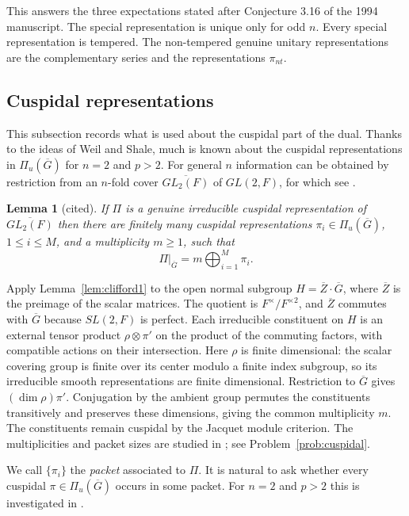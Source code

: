 \documentclass[12pt,letterpaper]{article}
\numberwithin{equation}{section}
\newtheorem{lemma}[theorem]{Lemma}
\theoremstyle{definition}
\newcommand{\cited}{cited}
\newcommand{\bG}{\overline{G}}
\newcommand{\Piu}{\Pi_{u}(\bG)}
\begin{document}
This answers the three expectations stated after Conjecture 3.16 of the 1994 manuscript.
The special representation is unique only for odd $n$.  Every special representation is
tempered.  The non-tempered genuine unitary representations are the complementary series
and the representations $\pi_{nt}$.

\subsection{Cuspidal representations}\label{subsec:cuspidal}

This subsection records what is used about the cuspidal part of the dual.  Thanks to the
ideas of Weil and Shale, much is known about the cuspidal representations in $\Piu$ for
$n=2$ and $p>2$.  For general $n$ information can be obtained by restriction from an
$n$-fold cover $\overline{GL_2(F)}$ of $GL(2,F)$, for which see \cite{Fl80,Bl85,GSS26}.

\begin{lemma}[\cited]\label{lem:restriction}
If $\Pi$ is a genuine irreducible cuspidal representation of $\overline{GL_2(F)}$ then
there are finitely many cuspidal representations $\pi_i\in\Piu$, $1\le i\le M$, and a
multiplicity $m\ge1$, such that
\[
\Pi|_{\bG}=m\bigoplus_{i=1}^M\pi_i .
\]
\end{lemma}
Apply Lemma~\ref{lem:clifford1} to the open normal subgroup
$H=\overline Z\cdot\bG$, where $\overline Z$ is the preimage of the scalar matrices.
The quotient is $F^\times/F^{\times2}$, and $\overline Z$ commutes with $\bG$
because $SL(2,F)$ is perfect. Each irreducible constituent on $H$ is an external
tensor product $\rho\otimes\pi'$ on the product of the commuting factors, with
compatible actions on their intersection. Here $\rho$ is finite dimensional:
the scalar covering group is finite over its center modulo a finite index
subgroup, so its irreducible smooth representations are finite dimensional.
Restriction to $\bG$ gives $(\dim\rho)\pi'$. Conjugation by the ambient group
permutes the constituents transitively and preserves these dimensions, giving
the common multiplicity $m$. The constituents remain cuspidal by the Jacquet
module criterion. The multiplicities and packet sizes are studied in
\cite{GSS26}; see Problem~\ref{prob:cuspidal}.

We call $\{\pi_i\}$ the \emph{packet} associated to $\Pi$.  It is natural to ask whether
every cuspidal $\pi\in\Piu$ occurs in some packet.  For $n=2$ and $p>2$ this is
investigated in \cite{GPS83}.
\end{document}
